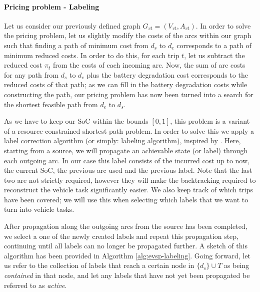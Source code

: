 \documentclass[]{article}
\begin{document}
\paragraph{Pricing problem - Labeling} \label{sec:labeling-evsp}
Let us consider our previously defined graph $G_{vt} = (V_{vt}, A_{vt})$. In order to solve the pricing problem, let us slightly modify the costs of the arcs within our graph such that finding a path of minimum cost from $d_s$ to $d_e$ corresponds to a path of minimum reduced costs. In order to do this, for each trip $t$, let us subtract the reduced cost $\pi_t$ from the costs of each incoming arc. Now, the sum of arc costs for any path from $d_s$ to $d_e$ plus the battery degradation cost corresponds to the reduced costs of that path; as we can fill in the battery degradation costs while constructing the path, our pricing problem has now been turned into a search for the shortest feasible path from $d_e$ to $d_s$.

As we have to keep our SoC within the bounds $[0, 1]$, this problem is a variant of a resource-constrained shortest path problem. In order to solve this we apply a label correction algorithm (or simply: labeling algorithm), inspired by \citet{Huang2016}. Here, starting from a source, we will propagate an achievable state (or label) through each outgoing arc. In our case this label consists of the incurred cost up to now, the current SoC, the previous arc used and the previous label. Note that the last two are not strictly required, however they will make the backtracking required to reconstruct the vehicle task significantly easier. We also keep track of which trips have been covered; we will use this when selecting which labels that we want to turn into vehicle tasks. 

After propagation along the outgoing arcs from the source has been completed, we select a one of the newly created labels and repeat this propagation step, continuing until all labels can no longer be propagated further. A sketch of this algorithm has been provided in Algorithm \ref{alg:evsp-labeling}. Going forward, let us refer to the collection of labels that reach a certain node in $\{ d_s \} \cup T$ as being \textit{contained} in that node, and let any labels that have not yet been propagated be referred to as \emph{active}. 
\end{document}
